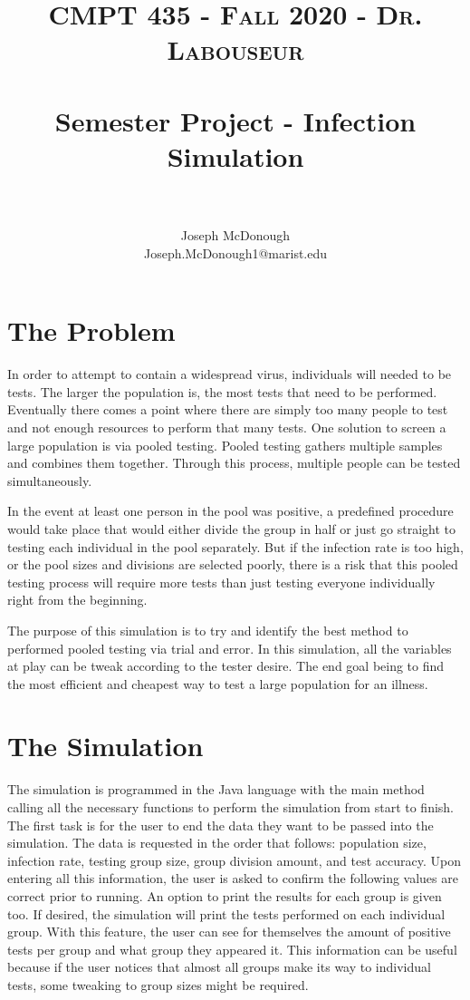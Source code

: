 \documentclass[letterpaper, 10pt,DIV=13]{scrartcl}
\title{	
   \normalfont \normalsize 
   \textsc{CMPT 435 - Fall 2020 - Dr. Labouseur} \\[10pt] %
   \horrule{0.5pt} \\[0.25cm] 	%
   \huge Semester Project - Infection Simulation  \\     	    %
   \horrule{0.5pt} \\[0.25cm] 	%
}
\author{Joseph McDonough \\ \normalsize Joseph.McDonough1@marist.edu}
\date{\normalize{December 11, 2020}}	%
\numberwithin{equation}{section} %
\numberwithin{figure}{section} %
\numberwithin{table}{section} %
\begin{document}
\maketitle %

\section{The Problem}

In order to attempt to contain a widespread virus, individuals will needed to be tests.  The larger the population is, the most tests that need to be performed.  Eventually there comes a point where there are simply too many people to test and not enough resources to perform that many tests.  One solution to screen a large population is via pooled testing.  Pooled testing gathers multiple samples and combines them together.  Through this process, multiple people can be tested simultaneously.  

In the event at least one person in the pool was positive, a predefined procedure would take place that would either divide the group in half or just go straight to testing each individual in the pool separately.  But if the infection rate is too high, or the pool sizes and divisions are selected poorly, there is a risk that this pooled testing process will require more tests than just testing everyone individually right from the beginning.

The purpose of this simulation is to try and identify the best method to performed pooled testing via trial and error.  In this simulation, all the variables at play can be tweak according to the tester desire.  The end goal being to find the most efficient and cheapest way to test a large population for an illness.

\section{The Simulation}

The simulation is programmed in the Java language with the main method calling all the necessary functions to perform the simulation from start to finish.  The first task is for the user to end the data they want to be passed into the simulation.  The data is requested in the order that follows: population size, infection rate, testing group size, group division amount, and test accuracy.  Upon entering all this information, the user is asked to confirm the following values are correct prior to running.  An option to print the results for each group is given too.  If desired, the simulation will print the tests performed on each individual group.  With this feature, the user can see for themselves the amount of positive tests per group and what group they appeared it.  This information can be useful because if the user notices that almost all groups make its way to individual tests, some tweaking to group sizes might be required.  
\end{document}
